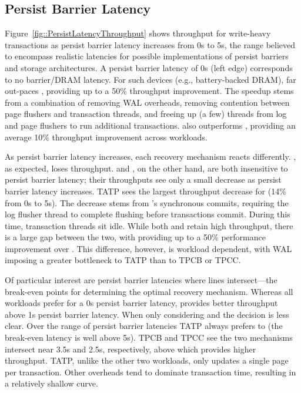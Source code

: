 \subsection{Persist Barrier Latency}
\label{sec:OLTP_eval:Persists:Performance}



Figure~\ref{fig::PersistLatencyThroughput} shows throughput for write-heavy transactions as persist barrier latency increases from 0\textmu s to 5\textmu s, the range believed to encompass realistic latencies for possible implementations of persist barriers and storage architectures.
A persist barrier latency of 0\textmu s (left edge) corresponds to no barrier/DRAM latency.
For such devices (e.g., battery-backed DRAM), \InPlace far out-paces \NVDisk, providing up to a 50\% throughput improvement.
The speedup stems from a combination of removing WAL overheads, removing contention between page flushers and transaction threads, and freeing up (a few) threads from log and page flushers to run additional transactions.
\InPlace also outperforms \GroupCommit, providing an average 10\% throughput improvement across workloads.

As persist barrier latency increases, each recovery mechanism reacts differently.
\InPlace, as expected, loses throughput.
\NVDisk and \GroupCommit, on the other hand, are both insensitive to persist barrier latency; their throughputs see only a small decrease as persist barrier latency increases.
TATP sees the largest throughput decrease for \NVDisk (14\% from 0\textmu s to 5\textmu s).
The decrease stems from \NVDisk's synchronous commits, requiring the log flusher thread to complete flushing before transactions commit.
During this time, transaction threads sit idle.
While both \NVDisk and \GroupCommit retain high throughput, there is a large gap between the two, with \GroupCommit providing up to a 50\% performance improvement over \NVDisk.
This difference, however, is workload dependent, with WAL imposing a greater bottleneck to TATP than to TPCB or TPCC.

Of particular interest are persist barrier latencies where lines intersect---the break-even points for determining the optimal recovery mechanism.
Whereas all workloads prefer \InPlace for a 0\textmu s persist barrier latency, \GroupCommit provides better throughput above 1\textmu s persist barrier latency.
When only considering \InPlace and \NVDisk the decision is less clear.
Over the range of persist barrier latencies TATP always prefers \InPlace to \NVDisk (the break-even latency is well above 5\textmu s).
TPCB and TPCC see the two mechanisms intersect near 3.5\textmu s and 2.5\textmu s, respectively, above which \NVDisk provides higher throughput.
TATP, unlike the other two workloads, only updates a single page per transaction.
Other overheads tend to dominate transaction time, resulting in a relatively shallow \InPlace curve.


